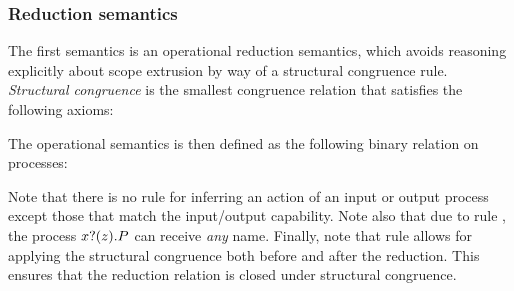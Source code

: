 \subsubsection{Reduction semantics}
The first semantics is an operational reduction semantics, which avoids reasoning explicitly about scope extrusion by way of a structural congruence rule.
\emph{Structural congruence} is the smallest congruence relation that satisfies the following axioms:

The operational semantics is then defined as the following binary relation on processes:
Note that there is no rule for inferring an action of an input or output process except those that match the input/output capability.
Note also that due to rule , the process \( x ? (z) . P \) can receive \emph{any} name.
Finally, note that rule  allows for applying the structural congruence both before and after the reduction.
This ensures that the reduction relation is closed under structural congruence.

